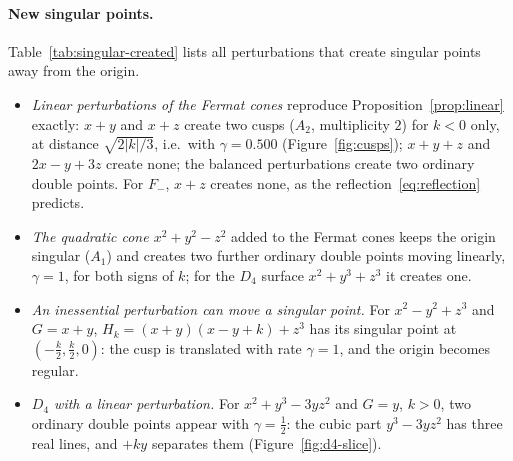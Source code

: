 \paragraph{New singular points.} Table~\ref{tab:singular-created} lists all
perturbations that create singular points away from the origin.
\begin{itemize}
    \item \emph{Linear perturbations of the Fermat cones} reproduce
          Proposition~\ref{prop:linear} exactly: $x+y$ and $x+z$ create two cusps
          ($A_2$, multiplicity $2$) for $k<0$ only, at distance $\sqrt{2|k|/3}$,
          i.e.\ with $\gamma=0.500$ (Figure~\ref{fig:cusps}); $x+y+z$ and $2x-y+3z$ create none; the
          balanced perturbations create two ordinary double points. For $F_-$,
          $x+z$ creates none, as the reflection~\eqref{eq:reflection} predicts.
    \item \emph{The quadratic cone $x^2+y^2-z^2$} added to the Fermat cones
          keeps the origin singular ($A_1$) and creates two further ordinary
          double points moving linearly, $\gamma=1$, for both signs of $k$; for
          the $D_4$ surface $x^2+y^3+z^3$ it creates one.
    \item \emph{An inessential perturbation can move a singular point.} For
          $x^2-y^2+z^3$ and $G=x+y$, $H_k=(x+y)(x-y+k)+z^3$ has its singular
          point at $(-\frac k2,\frac k2,0)$: the cusp is translated with rate
          $\gamma=1$, and the origin becomes regular.
    \item \emph{$D_4$ with a linear perturbation.} For $x^2+y^3-3yz^2$ and
          $G=y$, $k>0$, two ordinary double points appear with $\gamma=\frac12$:
          the cubic part $y^3-3yz^2$ has three real lines, and $+ky$ separates
          them (Figure~\ref{fig:d4-slice}).
\end{itemize}


